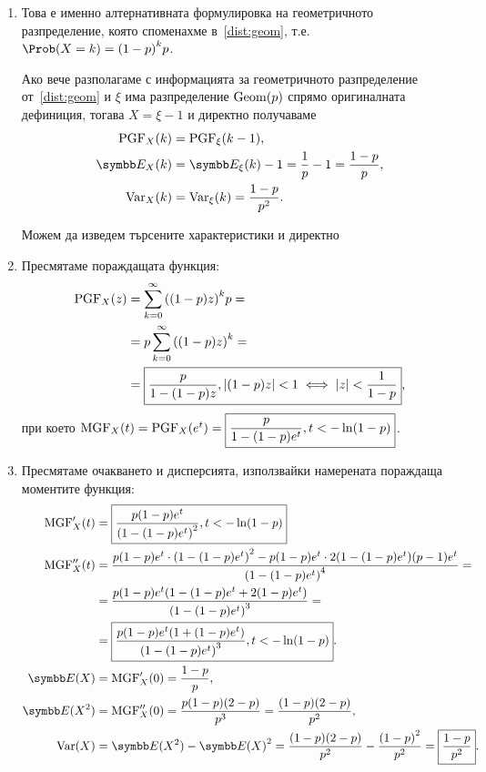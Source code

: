 \documentclass[numbers=endperiod, bibliography=totocnumbered]{scrartcl}
\begin{document}
\begin{solution}
  \mbox{}
  \begin{enumerate}[label=\alph*)]
    \item Това е именно алтернативната формулировка на геометричното разпределение, която споменахме в~\ref{dist:geom}, т.е. \( \Prob(X = k) = {(1-p)}^k p \).

    Ако вече разполагаме с информацията за геометричното разпределение от~\ref{dist:geom} и \( \xi \) има разпределение \( \operatorname{Geom}(p) \) спрямо оригиналната дефиниция, тогава \( X = \xi - 1 \) и директно получаваме
    \begin{align*}
      \PGF_X(k) &= \PGF_\xi(k-1), \\
      \Expect_X(k) &= \Expect_\xi(k) - 1 = \frac 1 p - 1 = \frac {1-p} p, \\
      \Var_X(k) &= \Var_\xi(k) = \frac {1-p} {p^2}.
    \end{align*}

    Можем да изведем търсените характеристики и директно
    \item Пресмятаме пораждащата функция:
    \begin{align*}
      \operatorname{PGF}_X(z)
      &=
      \sum_{k=0}^\infty {((1-p) z)}^k p
      = \\ &=
      p \sum_{k=0}^\infty {((1-p) z)}^k
      = \\ &=
      \boxed{\frac p {1 - (1-p)z}, \left\vert (1-p) z \right\vert < 1 \iff \left\vert z \right\vert < \frac 1 {1-p}},
    \end{align*}
    при което \( \operatorname{MGF}_X(t) = \operatorname{PGF}_X(e^t) = \boxed{\frac p {1 - (1-p)e^t}, t < -\ln(1-p)} \).

    \item Пресмятаме очакването и дисперсията, използвайки намерената пораждаща моментите функция:
    \begingroup
    \allowdisplaybreaks
    \begin{align*}
      \MGF'_X(t)
      &=
      \boxed{\frac {p (1-p) e^t} {{(1-(1-p)e^t)}^2}, t < -\ln(1-p)}
      \\
      \MGF''_X(t)
      &=
      \frac {p (1-p) e^t \cdot {(1-(1-p)e^t)}^2 - p (1-p) e^t \cdot 2 (1-(1-p)e^t)(p-1) e^t} {{(1-(1-p)e^t)}^4}
      = \\ &=
      \frac {p (1-p) e^t (1-(1-p)e^t+2(1-p)e^t)} {{(1-(1-p)e^t)}^3}
      = \\ &=
      \boxed{\frac {p (1-p) e^t(1+(1-p)e^t)} {{(1-(1-p)e^t)}^3}, t < -\ln(1-p)}.
      \\
      \Expect(X)
      &=
      \MGF'_X(0)
      =
      \frac {1-p} p,
      \\
      \Expect(X^2)
      &=
      \MGF''_X(0)
      =
      \frac {p(1-p)(2-p)} {p^3}
      =
      \frac {(1-p)(2-p)} {p^2},
      \\
      \Var(X)
      &=
      \Expect(X^2) - {\Expect(X)}^2
      =
      \frac {(1-p)(2-p)} {p^2} - \frac {{(1-p)}^2} {p^2}
      =
      \boxed{\frac {1-p} {p^2}}.
    \end{align*}
    \endgroup


\end{enumerate}
\end{solution}
\end{document}
